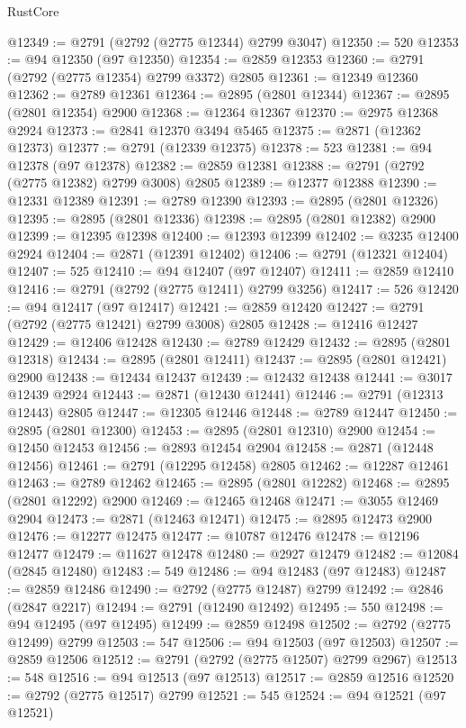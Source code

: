 \begin{lexlean}{RustCore}
\begin{coremodule}
@12349 := @2791 (@2792 (@2775 @12344) @2799 @3047)
@12350 := 520
@12353 := @94 @12350 (@97 @12350)
@12354 := @2859 @12353
@12360 := @2791 (@2792 (@2775 @12354) @2799 @3372) @2805
@12361 := @12349 @12360
@12362 := @2789 @12361
@12364 := @2895 (@2801 @12344)
@12367 := @2895 (@2801 @12354) @2900
@12368 := @12364 @12367
@12370 := @2975 @12368 @2924
@12373 := @2841 @12370 @3494 @5465
@12375 := @2871 (@12362 @12373)
@12377 := @2791 (@12339 @12375)
@12378 := 523
@12381 := @94 @12378 (@97 @12378)
@12382 := @2859 @12381
@12388 := @2791 (@2792 (@2775 @12382) @2799 @3008) @2805
@12389 := @12377 @12388
@12390 := @12331 @12389
@12391 := @2789 @12390
@12393 := @2895 (@2801 @12326)
@12395 := @2895 (@2801 @12336)
@12398 := @2895 (@2801 @12382) @2900
@12399 := @12395 @12398
@12400 := @12393 @12399
@12402 := @3235 @12400 @2924
@12404 := @2871 (@12391 @12402)
@12406 := @2791 (@12321 @12404)
@12407 := 525
@12410 := @94 @12407 (@97 @12407)
@12411 := @2859 @12410
@12416 := @2791 (@2792 (@2775 @12411) @2799 @3256)
@12417 := 526
@12420 := @94 @12417 (@97 @12417)
@12421 := @2859 @12420
@12427 := @2791 (@2792 (@2775 @12421) @2799 @3008) @2805
@12428 := @12416 @12427
@12429 := @12406 @12428
@12430 := @2789 @12429
@12432 := @2895 (@2801 @12318)
@12434 := @2895 (@2801 @12411)
@12437 := @2895 (@2801 @12421) @2900
@12438 := @12434 @12437
@12439 := @12432 @12438
@12441 := @3017 @12439 @2924
@12443 := @2871 (@12430 @12441)
@12446 := @2791 (@12313 @12443) @2805
@12447 := @12305 @12446
@12448 := @2789 @12447
@12450 := @2895 (@2801 @12300)
@12453 := @2895 (@2801 @12310) @2900
@12454 := @12450 @12453
@12456 := @2893 @12454 @2904
@12458 := @2871 (@12448 @12456)
@12461 := @2791 (@12295 @12458) @2805
@12462 := @12287 @12461
@12463 := @2789 @12462
@12465 := @2895 (@2801 @12282)
@12468 := @2895 (@2801 @12292) @2900
@12469 := @12465 @12468
@12471 := @3055 @12469 @2904
@12473 := @2871 (@12463 @12471)
@12475 := @2895 @12473 @2900
@12476 := @12277 @12475
@12477 := @10787 @12476
@12478 := @12196 @12477
@12479 := @11627 @12478
@12480 := @2927 @12479
@12482 := @12084 (@2845 @12480)
@12483 := 549
@12486 := @94 @12483 (@97 @12483)
@12487 := @2859 @12486
@12490 := @2792 (@2775 @12487) @2799
@12492 := @2846 (@2847 @2217)
@12494 := @2791 (@12490 @12492)
@12495 := 550
@12498 := @94 @12495 (@97 @12495)
@12499 := @2859 @12498
@12502 := @2792 (@2775 @12499) @2799
@12503 := 547
@12506 := @94 @12503 (@97 @12503)
@12507 := @2859 @12506
@12512 := @2791 (@2792 (@2775 @12507) @2799 @2967)
@12513 := 548
@12516 := @94 @12513 (@97 @12513)
@12517 := @2859 @12516
@12520 := @2792 (@2775 @12517) @2799
@12521 := 545
@12524 := @94 @12521 (@97 @12521)

\end{coremodule}
\end{lexlean}
